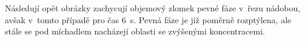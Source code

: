 \vspace{-9mm}

\newpage

Následují opět obrázky zachycují objemový zlomek pevné fáze v~řezu nádobou, avšak v~tomto případě pro čas \SI{6}{\second}. Pevná fáze je již poměrně rozptýlena, ale stále se pod míchadlem nacházejí oblasti se zvýšenými koncentracemi.

\begin{figure}[h!]
  \centering
  \qquad             

\end{figure}
